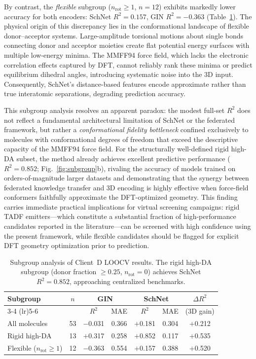 \documentclass[twocolumn]{article}
\newcommand{\Rsq}{R^{2}}
\begin{document}
By contrast, the \emph{flexible} subgroup ($n_{\text{rot}} \geq 1$, $n = 12$) exhibits markedly lower accuracy for both encoders: SchNet $\Rsq = 0.157$, GIN $\Rsq = -0.363$ (Table~\ref{tab:subgroup}).
The physical origin of this discrepancy lies in the conformational landscape of flexible donor--acceptor systems.
Large-amplitude torsional motions about single bonds connecting donor and acceptor moieties create flat potential energy surfaces with multiple low-energy minima.
The MMFF94 force field, which lacks the electronic correlation effects captured by DFT, cannot reliably rank these minima or predict equilibrium dihedral angles, introducing systematic noise into the 3D input.
Consequently, SchNet's distance-based features encode approximate rather than true interatomic separations, degrading prediction accuracy.

This subgroup analysis resolves an apparent paradox: the modest full-set $\Rsq$ does not reflect a fundamental architectural limitation of SchNet or the federated framework, but rather a \emph{conformational fidelity bottleneck} confined exclusively to molecules with conformational degrees of freedom that exceed the descriptive capacity of the MMFF94 force field.
For the structurally well-defined rigid high-DA subset, the method already achieves excellent predictive performance ($\Rsq = 0.852$; Fig.~\ref{fig:subgroup}b), rivaling the accuracy of models trained on orders-of-magnitude larger datasets and demonstrating that the synergy between federated knowledge transfer and 3D encoding is highly effective when force-field conformers faithfully approximate the DFT-optimized geometry.
This finding carries immediate practical implications for virtual screening campaigns: rigid TADF emitters---which constitute a substantial fraction of high-performance candidates reported in the literature---can be screened with high confidence using the present framework, while flexible candidates should be flagged for explicit DFT geometry optimization prior to prediction.

\begin{table}[h]
\centering
\caption{Subgroup analysis of Client~D LOOCV results. The rigid high-DA subgroup (donor fraction $\geq 0.25$, $n_{\text{rot}} = 0$) achieves SchNet $\Rsq = 0.852$, approaching centralized benchmarks.}
\label{tab:subgroup}
\small
\begin{tabular}{@{}lcccccc@{}}
\toprule
Subgroup & $n$ & \multicolumn{2}{c}{GIN} & \multicolumn{2}{c}{SchNet} & $\Delta \Rsq$ \\
\cmidrule(lr){3-4} \cmidrule(lr){5-6}
         &     & $\Rsq$ & MAE & $\Rsq$ & MAE & (3D gain) \\
\midrule
All molecules       & 53 & $-$0.031 & 0.366 & $+$0.181 & 0.304 & $+$0.212 \\
Rigid high-DA       & 13 & $+$0.317 & 0.258 & $+$0.852 & 0.117 & $+$0.535 \\
Flexible ($n_{\text{rot}} \geq 1$) & 12 & $-$0.363 & 0.554 & $+$0.157 & 0.388 & $+$0.520 \\
\bottomrule
\end{tabular}
\end{table}
\end{document}
